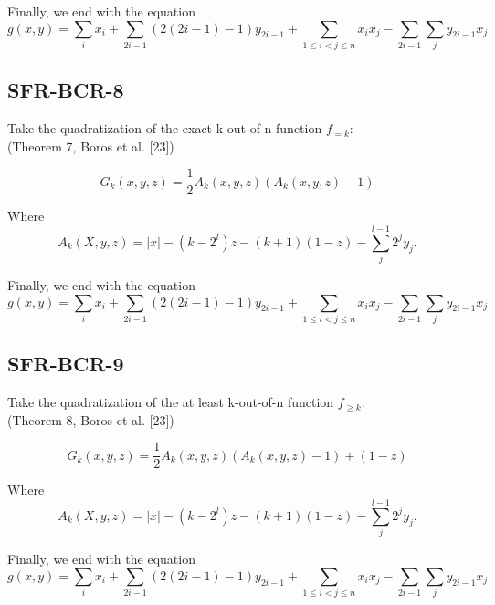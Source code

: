 \documentclass[a4paper,11pt]{article}
\begin{document}
\noindent Finally, we end with the equation
\begin{equation}
  g(x,y) = \sum_i x_i + \sum_{2i - 1}(2(2i - 1)-1)y_{2i - 1} + \sum_{1\leq i<j\leq n}x_ix_j - \sum_{2i - 1}\sum_jy_{2i - 1} x_j
\end{equation}



\subsection{SFR-BCR-8}

Take the quadratization of the exact k-out-of-n function $f_{=k}$:
\\(Theorem 7, Boros et al. [23])

\begin{equation}
  G_k(x,y,z) = \frac{1}{2}A_k(x,y,z)(A_k(x,y,z)-1)
\end{equation}

\noindent Where
\begin{equation}
  A_k(X,y,z) = |x| - (k-2^l)z - (k+1)(1-z) - \sum_{j}^{l-1}2^jy_j.
\end{equation}


\noindent Finally, we end with the equation
\begin{equation}
  g(x,y) = \sum_i x_i + \sum_{2i - 1}(2(2i - 1)-1)y_{2i - 1} + \sum_{1\leq i<j\leq n}x_ix_j - \sum_{2i - 1}\sum_jy_{2i - 1} x_j
\end{equation}

\subsection{SFR-BCR-9}

Take the quadratization of the at least k-out-of-n function $f_{\geq k}$:
\\(Theorem 8, Boros et al. [23])

\begin{equation}
  G_k(x,y,z) = \frac{1}{2}A_k(x,y,z)(A_k(x,y,z)-1) + (1-z)
\end{equation}

\noindent Where
\begin{equation}
  A_k(X,y,z) = |x| - (k-2^l)z - (k+1)(1-z) - \sum_{j}^{l-1}2^jy_j.
\end{equation}

\noindent Finally, we end with the equation
\begin{equation}
  g(x,y) = \sum_i x_i + \sum_{2i - 1}(2(2i - 1)-1)y_{2i - 1} + \sum_{1\leq i<j\leq n}x_ix_j - \sum_{2i - 1}\sum_jy_{2i - 1} x_j
\end{equation}
\end{document}
